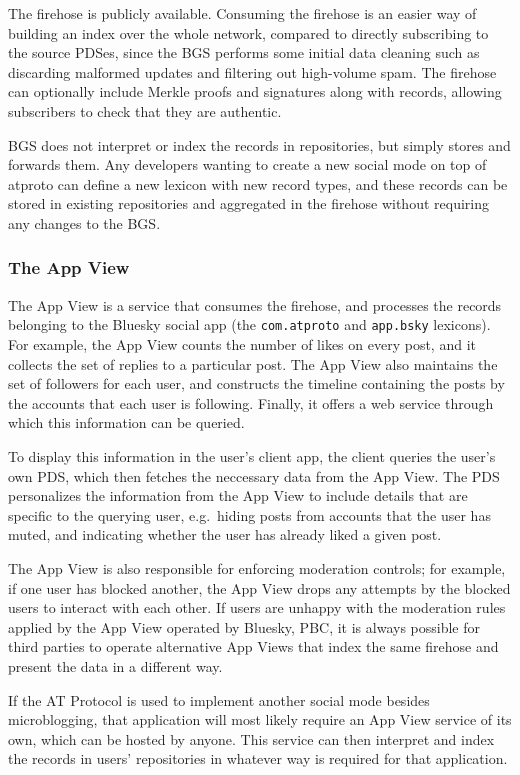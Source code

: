 \documentclass[sigconf,review]{acmart}
\begin{document}
The firehose is publicly available.
Consuming the firehose is an easier way of building an index over the whole network, compared to directly subscribing to the source PDSes, since the BGS performs some initial data cleaning such as discarding malformed updates and filtering out high-volume spam.
The firehose can optionally include Merkle proofs and signatures along with records, allowing subscribers to check that they are authentic.

BGS does not interpret or index the records in repositories, but simply stores and forwards them.
Any developers wanting to create a new social mode on top of atproto can define a new lexicon with new record types, and these records can be stored in existing repositories and aggregated in the firehose without requiring any changes to the BGS.

\subsubsection{The App View}\label{sec:appview}

The App View is a service that consumes the firehose, and processes the records belonging to the Bluesky social app (the \texttt{com.atproto} and \texttt{app.bsky} lexicons).
For example, the App View counts the number of likes on every post, and it collects the set of replies to a particular post.
The App View also maintains the set of followers for each user, and constructs the timeline containing the posts by the accounts that each user is following.
Finally, it offers a web service through which this information can be queried.

To display this information in the user's client app, the client queries the user's own PDS, which then fetches the neccessary data from the App View.
The PDS personalizes the information from the App View to include details that are specific to the querying user, e.g.\ hiding posts from accounts that the user has muted, and indicating whether the user has already liked a given post.

The App View is also responsible for enforcing moderation controls; for example, if one user has blocked another, the App View drops any attempts by the blocked users to interact with each other.
If users are unhappy with the moderation rules applied by the App View operated by Bluesky, PBC, it is always possible for third parties to operate alternative App Views that index the same firehose and present the data in a different way.

If the AT Protocol is used to implement another social mode besides microblogging, that application will most likely require an App View service of its own, which can be hosted by anyone.
This service can then interpret and index the records in users' repositories in whatever way is required for that application.
\end{document}
